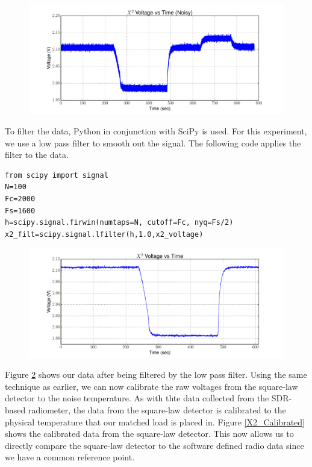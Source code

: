 {\begin{figure}[h!tb] \centering
\includegraphics[width=\textwidth]{Experiments/Exp1/noisy_voltage.pdf}
\label{X2_Raw}
\end{figure}

To filter the data, Python in conjunction with SciPy is used.  For this experiment, we use a low pass filter to smooth out the signal.  The following code applies the filter to the data.

\begin{lstlisting}[frame=single,keywordstyle=\color{blue}]
from scipy import signal
N=100
Fc=2000
Fs=1600
h=scipy.signal.firwin(numtaps=N, cutoff=Fc, nyq=Fs/2)
x2_filt=scipy.signal.lfilter(h,1.0,x2_voltage)
\end{lstlisting}

\begin{figure}[h!tb] \centering
\includegraphics[width=\textwidth]{Experiments/Exp1/x2_filter.pdf}
\label{X2_filter}
\end{figure}

Figure \ref{X2_filter} shows our data after being filtered by the low pass filter.  Using the same technique as earlier, we can now calibrate the raw voltages from the square-law detector to the noise temperature.  As with thte data collected from the SDR-based radiometer, the data from the square-law detector is calibrated to the physical temperature that our matched load is placed in.  Figure \ref{X2_Calibrated} shows the calibrated data from the square-law detector.  This now allows us to directly compare the square-law detector to the software defined radio data since we have a common reference point.

}
